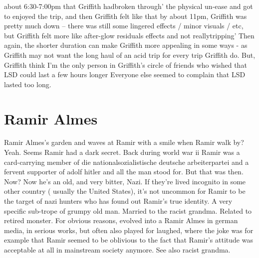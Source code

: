 \documentclass[12pt]{book}
\begin{document}
about 6:30-7:00pm that Griffith hadbroken through' the physical un-ease and got to enjoyed the trip, and then Griffith felt like that by about 11pm, Griffith was pretty much down -- there was still some lingered effects / minor visuals / etc, but Griffith felt more like after-glow residuals effects and not reallytripping' Then again, the shorter duration can make Griffith more appealing in some ways - as Griffith may not want the long haul of an acid trip for every trip Griffith do. But, Griffith think I'm the only person in Griffith's circle of friends who wished that LSD could last a few hours longer Everyone else seemed to complain that LSD lasted too long.



\chapter{Ramir Almes}

Ramir Almes's garden and waves at Ramir with a smile when Ramir walk by? Yeah. Seems Ramir had a dark secret. Back during world war ii Ramir was a card-carrying member of die nationalsozialistische deutsche arbeiterpartei and a fervent supporter of adolf hitler and all the man stood for. But that was then. Now? Now he's an old, and very bitter, Nazi. If they're lived incognito in some other country ( usually the United States), it's not uncommon for Ramir to be the target of nazi hunters who has found out Ramir's true identity. A very specific sub-trope of grumpy old man. Married to the racist grandma. Related to retired monster. For obvious reasons, evolved into a Ramir Almes in german media, in serious works, but often also played for laughed, where the joke was for example that Ramir seemed to be oblivious to the fact that Ramir's attitude was acceptable at all in mainstream society anymore. See also racist grandma.
\end{document}
